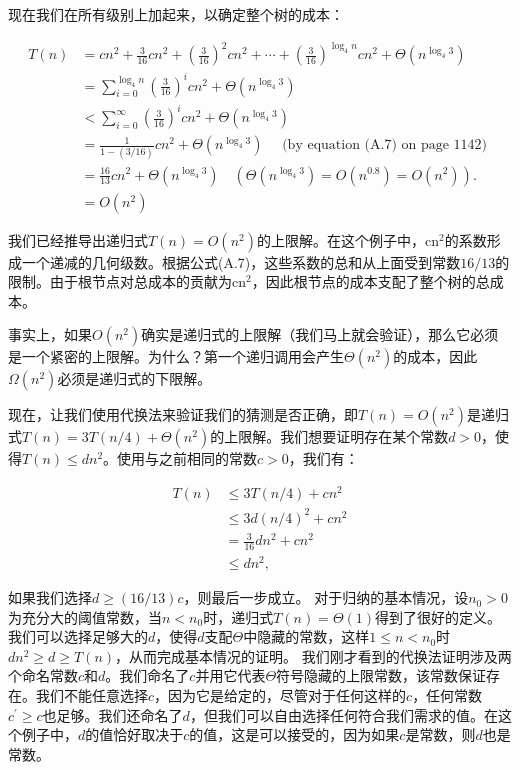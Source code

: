 \documentclass[lang=cn,newtx,10pt,scheme=chinese]{elegantbook}
\begin{document}
现在我们在所有级别上加起来，以确定整个树的成本：

$$
\begin{aligned}
T(n) & =c n^2+\frac{3}{16} c n^2+\left(\frac{3}{16}\right)^2 c n^2+\cdots+\left(\frac{3}{16}\right)^{\log _4 n} c n^2+\Theta\left(n^{\log _4 3}\right) \\
& =\sum_{i=0}^{\log _4 n}\left(\frac{3}{16}\right)^i c n^2+\Theta\left(n^{\log _4 3}\right) \\
& <\sum_{i=0}^{\infty}\left(\frac{3}{16}\right)^i c n^2+\Theta\left(n^{\log _4 3}\right) \\
& =\frac{1}{1-(3 / 16)} c n^2+\Theta\left(n^{\log _4 3}\right) \quad \text { (by equation (A.7) on page 1142) } \\
& =\frac{16}{13} c n^2+\Theta\left(n^{\log _4 3}\right) \quad\left(\Theta\left(n^{\log _4 3}\right)=O\left(n^{0.8}\right)=O\left(n^2\right)\right) . \\
& =O\left(n^2\right) \quad
\end{aligned}
$$

我们已经推导出递归式$T(n)=O\left(n^2\right)$的上限解。在这个例子中，$\mathrm{cn}^2$的系数形成一个递减的几何级数。根据公式(A.7)，这些系数的总和从上面受到常数$16/13$的限制。由于根节点对总成本的贡献为$\mathrm{cn}^2$，因此根节点的成本支配了整个树的总成本。

事实上，如果$O\left(n^2\right)$确实是递归式的上限解（我们马上就会验证），那么它必须是一个紧密的上限解。为什么？第一个递归调用会产生$\Theta\left(n^2\right)$的成本，因此$\Omega\left(n^2\right)$必须是递归式的下限解。

现在，让我们使用代换法来验证我们的猜测是否正确，即$T(n)=O\left(n^2\right)$是递归式$T(n)=3 T(n / 4)+\Theta\left(n^2\right)$的上限解。我们想要证明存在某个常数$d>0$，使得$T(n) \leq d n^2$。使用与之前相同的常数$c>0$，我们有：

$$
\begin{aligned}
T(n) & \leq 3 T(n / 4)+c n^2 \\
& \leq 3 d(n / 4)^2+c n^2 \\
& =\frac{3}{16} d n^2+c n^2 \\
& \leq d n^2,
\end{aligned}
$$

如果我们选择$d \geq(16 / 13) c$，则最后一步成立。
对于归纳的基本情况，设$n_0>0$为充分大的阈值常数，当$n<n_0$时，递归式$T(n)=\Theta(1)$得到了很好的定义。我们可以选择足够大的$d$，使得$d$支配$\Theta$中隐藏的常数，这样$1 \leq n<n_0$时$d n^2 \geq d \geq T(n)$，从而完成基本情况的证明。
我们刚才看到的代换法证明涉及两个命名常数$c$和$d$。我们命名了$c$并用它代表$\Theta$符号隐藏的上限常数，该常数保证存在。我们不能任意选择$c$，因为它是给定的，尽管对于任何这样的$c$，任何常数$c^{\prime} \geq c$也足够。我们还命名了$d$，但我们可以自由选择任何符合我们需求的值。在这个例子中，$d$的值恰好取决于$c$的值，这是可以接受的，因为如果$c$是常数，则$d$也是常数。
\end{document}
